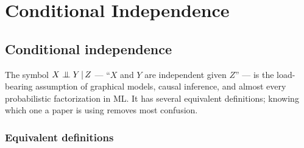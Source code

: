 \documentclass[11pt,oneside]{report}
\theoremstyle{plain}
\theoremstyle{definition}
\theoremstyle{remark}
\newcommand{\given}{\,\vert\,}
\newcommand{\indep}{\mathrel{\perp\mkern-10mu\perp}}
\numberwithin{equation}{chapter}
\begin{document}
\part{Conditional Independence}\label{part:cond-indep}

\chapter{Conditional independence}\label{ch:cond-indep}

The symbol $X\indep Y\given Z$ --- ``$X$ and $Y$ are independent given
$Z$'' --- is the load-bearing assumption of graphical models, causal
inference, and almost every probabilistic factorization in ML. It has
several equivalent definitions; knowing which one a paper is using removes
most confusion.

\section{Equivalent definitions}
\end{document}
